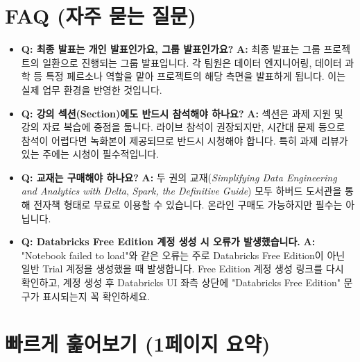 \documentclass[11pt,a4paper]{article}
\begin{document}
\begin{itemize}
\newpage

\section*{FAQ (자주 묻는 질문)}

\begin{itemize}
    \item \textbf{Q: 최종 발표는 개인 발표인가요, 그룹 발표인가요?}
    \textbf{A:} 최종 발표는 그룹 프로젝트의 일환으로 진행되는 그룹 발표입니다. 각 팀원은 데이터 엔지니어링, 데이터 과학 등 특정 페르소나 역할을 맡아 프로젝트의 해당 측면을 발표하게 됩니다. 이는 실제 업무 환경을 반영한 것입니다.

    \item \textbf{Q: 강의 섹션(Section)에도 반드시 참석해야 하나요?}
    \textbf{A:} 섹션은 과제 지원 및 강의 자료 복습에 중점을 둡니다. 라이브 참석이 권장되지만, 시간대 문제 등으로 참석이 어렵다면 녹화본이 제공되므로 반드시 시청해야 합니다. 특히 과제 리뷰가 있는 주에는 시청이 필수적입니다.

    \item \textbf{Q: 교재는 구매해야 하나요?}
    \textbf{A:} 두 권의 교재(\textit{Simplifying Data Engineering and Analytics with Delta}, \textit{Spark, the Definitive Guide}) 모두 하버드 도서관을 통해 전자책 형태로 무료로 이용할 수 있습니다. 온라인 구매도 가능하지만 필수는 아닙니다.

    \item \textbf{Q: Databricks Free Edition 계정 생성 시 오류가 발생했습니다.}
    \textbf{A:} "Notebook failed to load"와 같은 오류는 주로 Databricks Free Edition이 아닌 일반 Trial 계정을 생성했을 때 발생합니다. Free Edition 계정 생성 링크를 다시 확인하고, 계정 생성 후 Databricks UI 좌측 상단에 "Databricks Free Edition" 문구가 표시되는지 꼭 확인하세요.
\end{itemize}

\newpage

\section*{빠르게 훑어보기 (1페이지 요약)}

\begin{tcolorbox}[colback=myblue!20, colframe=blue!50!black, title=\textbf{CSCI103 Lecture 1 핵심 요약}, sharp corners, boxsep=5mm, left=3mm, right=3mm, top=3mm, bottom=3mm]


\end{tcolorbox}
\end{itemize}
\end{document}
